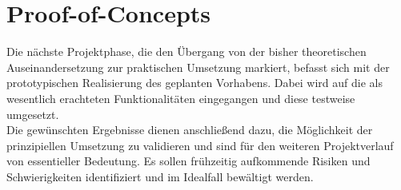 
\section{Proof-of-Concepts}
Die nächste Projektphase, die den Übergang von der bisher theoretischen Auseinandersetzung zur praktischen Umsetzung markiert, befasst sich mit der prototypischen Realisierung des geplanten Vorhabens. Dabei wird auf die als wesentlich erachteten  Funktionalitäten eingegangen und diese testweise umgesetzt.\\
Die gewünschten Ergebnisse dienen anschließend dazu, die Möglichkeit der prinzipiellen Umsetzung zu validieren und sind für den weiteren Projektverlauf von essentieller Bedeutung. Es sollen frühzeitig aufkommende Risiken und Schwierigkeiten identifiziert  und im Idealfall bewältigt werden.

\vspace{0.5cm}

